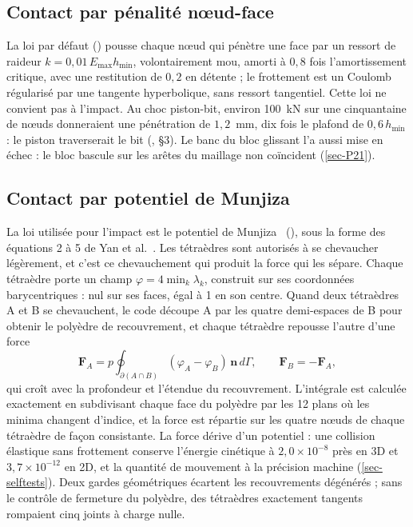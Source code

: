 \subsection{Contact par pénalité nœud-face}

La loi par défaut () pousse chaque nœud qui pénètre une face par un ressort de raideur $k = 0{,}01\,E_\text{max} h_\text{min}$, volontairement mou, amorti à $0{,}8$ fois l'amortissement critique, avec une restitution de $0{,}2$ en détente ; le frottement est un Coulomb régularisé par une tangente hyperbolique, sans ressort tangentiel. Cette loi ne convient pas à l'impact. Au choc piston-bit, environ 100~kN sur une cinquantaine de nœuds donneraient une pénétration de $1{,}2$~mm, dix fois le plafond de $0{,}6\,h_\text{min}$ : le piston traverserait le bit (, §3). Le banc du bloc glissant l'a aussi mise en échec : le bloc bascule sur les arêtes du maillage non coïncident (\cref{sec-P21}).

\subsection{Contact par potentiel de Munjiza}

La loi utilisée pour l'impact est le potentiel de Munjiza~\cite{munjiza2000penalty} (), sous la forme des équations 2 à 5 de Yan et al.~\cite{yan2023adaptive}. Les tétraèdres sont autorisés à se chevaucher légèrement, et c'est ce chevauchement qui produit la force qui les sépare. Chaque tétraèdre porte un champ $\varphi = 4 \min_k \lambda_k$, construit sur ses coordonnées barycentriques : nul sur ses faces, égal à 1 en son centre. Quand deux tétraèdres A et B se chevauchent, le code découpe A par les quatre demi-espaces de B pour obtenir le polyèdre de recouvrement, et chaque tétraèdre repousse l'autre d'une force
\[
\mathbf F_A = p \oint_{\partial(A\cap B)} (\varphi_A - \varphi_B)\, \mathbf n \, d\Gamma, \qquad \mathbf F_B = -\mathbf F_A,
\]
qui croît avec la profondeur et l'étendue du recouvrement. L'intégrale est calculée exactement en subdivisant chaque face du polyèdre par les 12 plans où les minima changent d'indice, et la force est répartie sur les quatre nœuds de chaque tétraèdre de façon consistante. La force dérive d'un potentiel : une collision élastique sans frottement conserve l'énergie cinétique à $2{,}0\times10^{-8}$ près en 3D et $3{,}7\times10^{-12}$ en 2D, et la quantité de mouvement à la précision machine (\cref{sec-selftests}). Deux gardes géométriques écartent les recouvrements dégénérés ; sans le contrôle de fermeture du polyèdre, des tétraèdres exactement tangents rompaient cinq joints à charge nulle.

